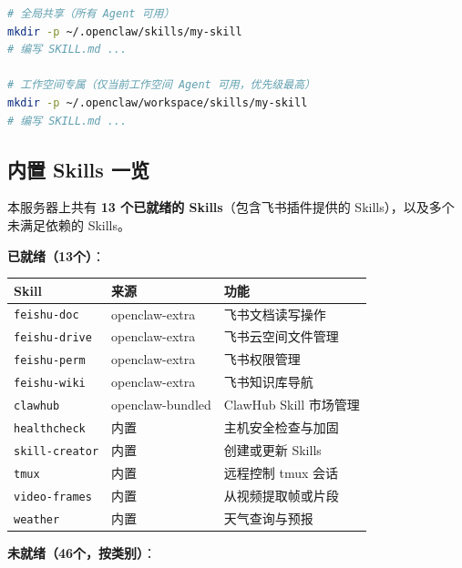 \begin{lstlisting}[language=bash]
# 全局共享（所有 Agent 可用）
mkdir -p ~/.openclaw/skills/my-skill
# 编写 SKILL.md ...

# 工作空间专属（仅当前工作空间 Agent 可用，优先级最高）
mkdir -p ~/.openclaw/workspace/skills/my-skill
# 编写 SKILL.md ...
\end{lstlisting}

\subsection{内置 Skills 一览}


本服务器上共有 \textbf{13 个已就绪的 Skills}（包含飞书插件提供的 Skills），以及多个未满足依赖的 Skills。

\textbf{已就绪（13个）}：

\begin{table}[h]
\centering
\small
\begin{tabular}{|l|l|p{}|}
\hline
Skill & 来源 & 功能 \\
\hline
\texttt{feishu-doc} & openclaw-extra & 飞书文档读写操作 \\
\hline
\texttt{feishu-drive} & openclaw-extra & 飞书云空间文件管理 \\
\hline
\texttt{feishu-perm} & openclaw-extra & 飞书权限管理 \\
\hline
\texttt{feishu-wiki} & openclaw-extra & 飞书知识库导航 \\
\hline
\texttt{clawhub} & openclaw-bundled & ClawHub Skill 市场管理 \\
\hline
\texttt{healthcheck} & 内置 & 主机安全检查与加固 \\
\hline
\texttt{skill-creator} & 内置 & 创建或更新 Skills \\
\hline
\texttt{tmux} & 内置 & 远程控制 tmux 会话 \\
\hline
\texttt{video-frames} & 内置 & 从视频提取帧或片段 \\
\hline
\texttt{weather} & 内置 & 天气查询与预报 \\
\hline
\end{tabular}
\end{table}
\textbf{未就绪（46个，按类别）}：

